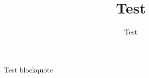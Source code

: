 \documentclass[type=zwischenbericht]{zukunftbau}
\title{Test}
\author{Test}
\begin{document}
\begin{Blockquote}
Test blockquote
\end{Blockquote}
\end{document}
